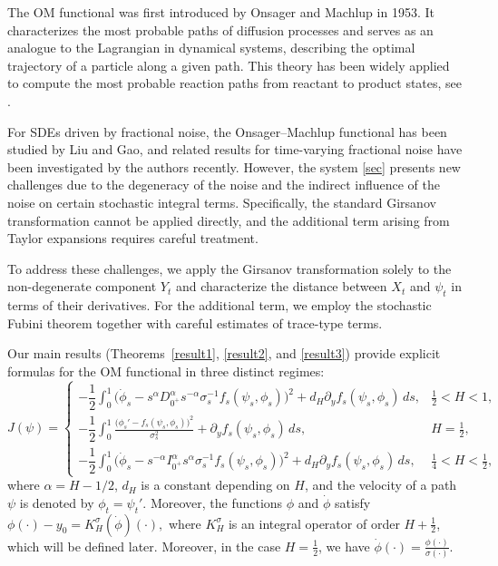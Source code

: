 \documentclass{article}
\theoremstyle{definition}  %
\theoremstyle{plain}  %
\begin{document}
The OM functional was first introduced by Onsager and Machlup \cite{Onsager1953} in 1953. It characterizes the most probable paths of diffusion processes and serves as an analogue to the Lagrangian in dynamical systems, describing the optimal trajectory of a particle along a given path. This theory has  been widely applied to compute the most probable reaction paths from reactant to product states, see \cite{BATTEZZATI2013163,10.1063/1.467139}.


For SDEs driven by fractional noise, the Onsager--Machlup functional has been studied by Liu and Gao\cite{Liu2026}, 
and related results for time-varying fractional noise have been investigated by the authors recently.  However, the system \eqref{sec} presents new challenges due to the degeneracy of the noise and the indirect influence of the noise on certain stochastic integral terms. Specifically, the standard Girsanov transformation cannot be applied directly, and the additional term arising from Taylor expansions requires careful treatment.

To address these challenges, we apply the Girsanov transformation solely to the non-degenerate component \(Y_t\) and characterize the distance between \(X_t\) and \(\psi_t\) in terms of their derivatives. For the additional term, we employ the stochastic Fubini theorem together with careful estimates of trace-type terms.


Our main results (Theorems~\ref{result1}, \ref{result2}, and \ref{result3}) provide explicit formulas for the OM functional in three distinct regimes:
\[
J(\psi) =
\begin{cases}
-\dfrac{1}{2}\displaystyle\int_0^1 
\Big(
\dot{\phi}_s
- s^{\alpha} D_{0^+}^\alpha s^{-\alpha} 
\sigma_s^{-1} f_s(\psi_s,\phi_s)
\Big)^2 
+ d_H \partial_y f_s(\psi_s,\phi_s) \, ds, 
& \tfrac{1}{2}<H<1, \\[2.2em]
-\dfrac{1}{2}\displaystyle\int_0^1 \frac{
\big(
\phi_s'
- f_s(\psi_s,\phi_s)
\big)^2}{\sigma_s^2} 
+ \partial_y f_s(\psi_s,\phi_s) \, ds,
& H=\tfrac{1}{2}, \\[2.2em]
-\dfrac{1}{2}\displaystyle\int_0^1 
\Big(
\dot{\phi}_s
- s^{-\alpha} I_{0^+}^\alpha s^{\alpha} 
\sigma_s^{-1} f_s(\psi_s,\phi_s)
\Big)^2 
+ d_H \partial_y f_s(\psi_s,\phi_s) \, ds,
& \tfrac{1}{4}<H<\tfrac{1}{2},
\end{cases}
\]
where \(\alpha = H - 1/2\), \(d_H\) is a constant depending on \(H\), and the velocity of a path \(\psi\) is denoted by \(\phi_t = \psi_t'\). Moreover, the functions $\phi$ and $\dot{\phi}$ satisfy $ 
    \phi(\cdot) - y_0 = K_H^\sigma(\dot{\phi})(\cdot),$ 
where $K_H^\sigma$ is an integral operator of order $H+\tfrac{1}{2}$, which will be defined later. Moreover, in the case $H=\tfrac{1}{2}$, we have $
    \dot{\phi}(\cdot) = \frac{\phi(\cdot)}{\sigma(\cdot)}.$
\end{document}

